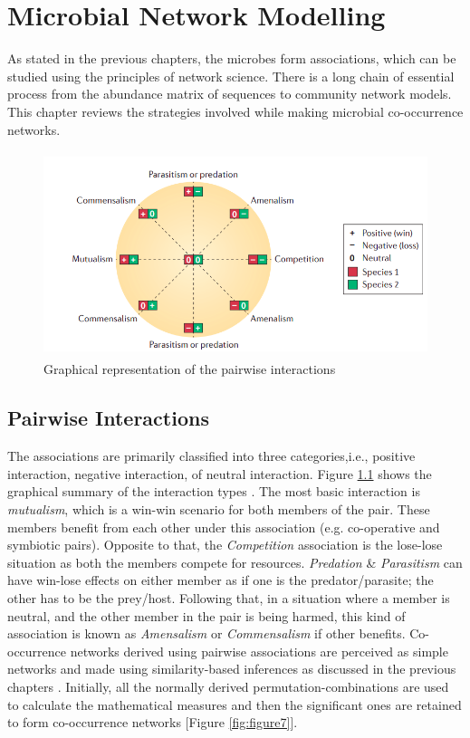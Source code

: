 \chapter{Microbial Network Modelling}
 \setcounter{page}{21}

As stated in the previous chapters, the microbes form associations, which can be studied using the principles of network science. There is a long chain of essential process from the abundance matrix of sequences to community network models. This chapter reviews the strategies involved while making microbial co-occurrence networks.

\begin{figure}[!hb]
  \centering
  \includegraphics[width=12cm, height=6cm] {../figures/Figure6.png}
  \caption{Graphical representation of the pairwise interactions}
  \label{fig:figure6}
\end{figure}

\section{Pairwise Interactions}
The associations are primarily classified into three categories,i.e., positive interaction, negative interaction, of neutral interaction. Figure \ref{fig:figure6} shows the graphical summary of the interaction types \cite{faust_2012_microbial}. The most basic interaction is \emph{mutualism}, which is a win-win scenario for both members of the pair. These members benefit from each other under this association (e.g. co-operative and symbiotic pairs). Opposite to that, the \emph{Competition} association is the lose-lose situation as both the members compete for resources. \emph{Predation} \& \emph{Parasitism} can have win-lose effects on either member as if one is the predator/parasite; the other has to be the prey/host. Following that, in a situation where a member is neutral, and the other member in the pair is being harmed, this kind of association is known as \emph{Amensalism} or \emph{Commensalism} if other benefits. Co-occurrence networks derived using pairwise associations are perceived as simple networks and made using similarity-based inferences as discussed in the previous chapters \cite{faust_2012_microbial}. Initially, all the normally derived permutation-combinations are used to calculate the mathematical measures and then the significant ones are retained to form co-occurrence networks [Figure \ref{fig:figure7}].

